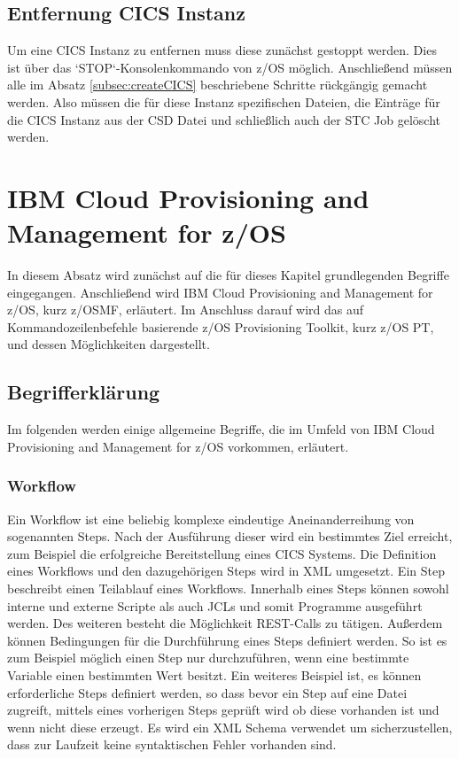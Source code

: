 \subsection{Entfernung CICS Instanz}
Um eine CICS Instanz zu entfernen muss diese zunächst gestoppt werden.
Dies ist über das `STOP`-Konsolenkommando von z/OS möglich.
Anschließend müssen alle im Absatz \ref{subsec:createCICS} beschriebene Schritte rückgängig gemacht werden.
Also müssen die für diese Instanz spezifischen Dateien, die Einträge für die CICS Instanz aus der CSD Datei und schließlich auch der STC Job gelöscht werden.

\section{IBM Cloud Provisioning and Management for z/OS}\label{sec:zosmf}
In diesem Absatz wird zunächst auf die für dieses Kapitel grundlegenden Begriffe eingegangen.
Anschließend wird IBM Cloud Provisioning and Management for z/OS, kurz z/OSMF, erläutert.
Im Anschluss darauf wird das auf Kommandozeilenbefehle basierende z/OS Provisioning Toolkit, kurz z/OS PT, und dessen Möglichkeiten dargestellt.

\subsection{Begrifferklärung}
Im folgenden werden einige allgemeine Begriffe, die im Umfeld von IBM Cloud Provisioning and Management for z/OS vorkommen, erläutert.

\subsubsection{Workflow}
Ein Workflow ist eine beliebig komplexe eindeutige Aneinanderreihung von sogenannten Steps.
Nach der Ausführung dieser wird ein bestimmtes Ziel erreicht, zum Beispiel die erfolgreiche Bereitstellung eines CICS Systems.
Die Definition eines Workflows und den dazugehörigen Steps wird in XML umgesetzt.
Ein Step beschreibt einen Teilablauf eines Workflows.
Innerhalb eines Steps können sowohl interne und externe Scripte als auch JCLs und somit Programme ausgeführt werden.
Des weiteren besteht die Möglichkeit REST-Calls zu tätigen.
Außerdem können Bedingungen für die Durchführung eines Steps definiert werden.
So ist es zum Beispiel möglich einen Step nur durchzuführen, wenn eine bestimmte Variable einen bestimmten Wert besitzt.
Ein weiteres Beispiel ist, es können erforderliche Steps definiert werden, so dass bevor ein Step auf eine Datei zugreift, mittels eines vorherigen Steps geprüft wird ob diese vorhanden ist und wenn nicht diese erzeugt.
Es wird ein XML Schema verwendet um sicherzustellen, dass zur Laufzeit keine syntaktischen Fehler vorhanden sind.
\cite{Rotthove.2018}

